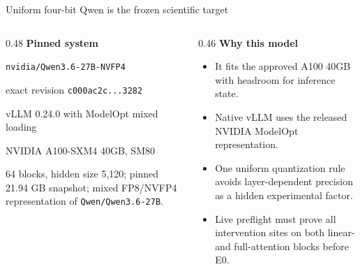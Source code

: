 \documentclass[aspectratio=169,11pt]{beamer}
\begin{document}
\begin{frame}{Uniform four-bit Qwen is the frozen scientific target}
  \small
  \begin{columns}[T,onlytextwidth]
    \begin{column}{0.48\textwidth}
      \textbf{Pinned system}\par\vspace{0.15cm}
      \texttt{nvidia/Qwen3.6-27B-NVFP4}\par
      exact revision \texttt{c000ac2c...3282}\par
      vLLM 0.24.0 with ModelOpt mixed loading\par
      NVIDIA A100-SXM4 40GB, SM80\par\vspace{0.35cm}
      64 blocks, hidden size 5,120; pinned 21.94 GB snapshot; mixed FP8/NVFP4 representation of \texttt{Qwen/Qwen3.6-27B}.
    \end{column}
    \begin{column}{0.46\textwidth}
      \textbf{Why this model}\par\vspace{0.15cm}
      \begin{itemize}\setlength\itemsep{0.13cm}
        \item It fits the approved A100 40GB with headroom for inference state.
        \item Native vLLM uses the released NVIDIA ModelOpt representation.
        \item One uniform quantization rule avoids layer-dependent precision as a hidden experimental factor.
        \item Live preflight must prove all intervention sites on both linear- and full-attention blocks before E0.
      \end{itemize}
    \end{column}
  \end{columns}
\end{frame}
\end{document}

